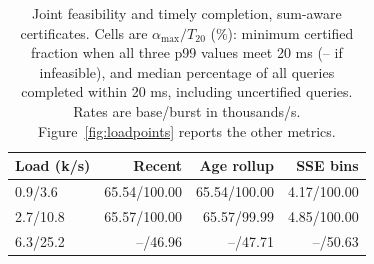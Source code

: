 \begin{table}[t]\centering\small
\caption{Joint feasibility and timely completion, sum-aware certificates. Cells are $\alpha_{\max}/T_{20}$ (\%): minimum certified fraction when all three p99 values meet 20 ms (-- if infeasible), and median percentage of all queries completed within 20 ms, including uncertified queries. Rates are base/burst in thousands/s. Figure~\ref{fig:loadpoints} reports the other metrics.}\label{tab:loadpoints}
\begin{tabular}{@{}lrrr@{}}\toprule
Load (k/s) & Recent & Age rollup & SSE bins\\\midrule
0.9/3.6 & 65.54/100.00 & 65.54/100.00 & 4.17/100.00\\
2.7/10.8 & 65.57/100.00 & 65.57/99.99 & 4.85/100.00\\
6.3/25.2 & --/46.96 & --/47.71 & --/50.63\\
\bottomrule\end{tabular}\end{table}
